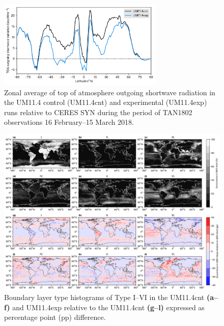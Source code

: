 \begin{figure}[p]
\centering
\includegraphics[width=0.7\textwidth]{chapter4/fig/sw_zonal.pdf}
\caption[Zonal average of top of atmosphere outgoing shortwave radiation]{
Zonal average of top of atmosphere outgoing shortwave radiation in
the UM11.4 control (UM11.4cnt) and experimental (UM11.4exp) runs relative
to CERES SYN during the period of TAN1802 observations 16 February--15 March 2018.
}
\label{fig:4:sw-zonal}
\end{figure}

\begin{figure}[p]
\centering
\centerline{\includegraphics[width=1.12\textwidth]{chapter4/fig/bdyt.png}}
\caption[Boundary layer type histograms]{Boundary layer type histograms of Type I--VI \citep{lock2000} in the UM11.4cnt
\textbf{(a--f)} and UM11.4exp relative to the UM11.4cnt \textbf{(g--l)} expressed as percentage point (pp)
difference.
}
\label{fig:4:bdyt}
\end{figure}

